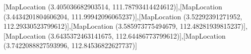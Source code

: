 [MapLocation (3.405036682903514, 111.78793414424612)],[MapLocation (3.4434201804606204, 111.99942096065237)],[MapLocation (3.52292391271952, 112.29330523799612)],[MapLocation (3.585973775494679, 112.48281939815237)],[MapLocation (3.6435372463141675, 112.64486773799612)],[MapLocation (3.7422088827593996, 112.84536822627737)]